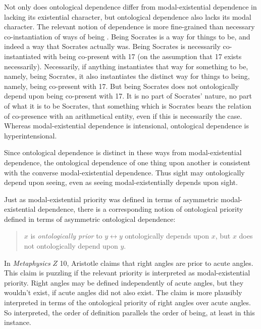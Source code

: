 \documentclass[12pt]{article}
\begin{document}
Not only does ontological dependence differ from modal-existential dependence in lacking its existential character, but ontological dependence also lacks its modal character. The relevant notion of dependence is more fine-grained than necessary co-instantiation of ways of being \citep[see][]{Fine:1994uq,Fine:1995ls,Schaffer:2009vn,Rosen:2010kx}. Being Socrates is a way for things to be, and indeed a way that Socrates actually was. Being Socrates is necessarily co-instantiated with being co-present with 17 (on the assumption that 17 exists necessarily). Necessarily, if anything instantiates that way for something to be, namely, being Socrates, it also instantiates the distinct way for things to being, namely, being co-present with 17. But being Socrates does not ontologically depend upon being co-present with 17. It is no part of Socrates' nature, no part of what it is to be Socrates, that something which is Socrates bears the relation of co-presence with an arithmetical entity, even if this is necessarily the case. Whereas modal-existential dependence is intensional, ontological dependence is hyperintensional.

Since ontological dependence is distinct in these ways from modal-existential dependence, the ontological dependence of one thing upon another is consistent with the converse modal-existential dependence. Thus sight may ontologically depend upon seeing, even as seeing modal-existentially depends upon sight. 


Just as modal-existential priority was defined in terms of asymmetric modal-existential dependence, there is a corresponding notion of ontological priority defined in terms of asymmetric ontological dependence:
\begin{quote}
	\( x \) is \emph{ontologically prior} to \( y  \leftrightarrow  y \) ontologically depends upon \( x \), but \( x \) does not ontologically depend upon \( y \).
\end{quote}
In \emph{Metaphysics} \( Z \) 10, Aristotle claims that right angles are prior to acute angles. This claim is puzzling if the relevant priority is interpreted as modal-existential priority. Right angles may be defined independently of acute angles, but they wouldn't exist, if acute angles did not also exist. The claim is more plausibly interpreted in terms of the ontological priority of right angles over acute angles. So interpreted, the order of definition parallels the order of being, at least in this instance.
\end{document}
